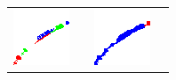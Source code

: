 \documentclass[preprint]{iucr}              %
\begin{document}
\begin{figure}
\begin{tabular}{>{\centering\arraybackslash}m{.1\linewidth}>{\centering\arraybackslash}m{.25\linewidth}>{\centering\arraybackslash}m{.25\linewidth}>{\centering\arraybackslash}m{.25\linewidth}}
\includegraphics[width=\linewidth]{Detail/o_max1_Regs_Zin_Smooth.png}& &
\includegraphics[width=\linewidth]{Detail/o_max1_Regs_Zin_thin.png}
\\

\end{tabular}
\end{figure}
\end{document}
